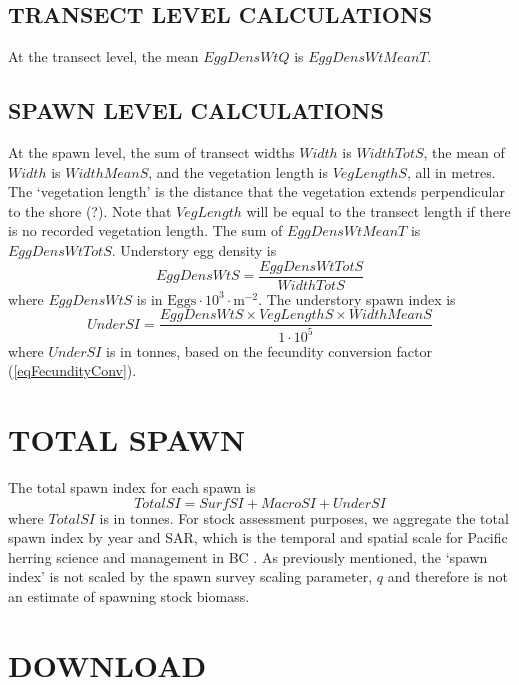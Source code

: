 \documentclass[12pt]{article}
\begin{document}
\subsection{TRANSECT LEVEL CALCULATIONS}

At the transect level, the mean $EggDensWtQ$ is $EggDensWtMeanT$.

\subsection{SPAWN LEVEL CALCULATIONS}

At the spawn level, the sum of transect widths $Width$ is $WidthTotS$, the mean of $Width$ is $WidthMeanS$, and the vegetation length is $VegLengthS$, all in metres.
The `vegetation length' is the distance that the vegetation extends perpendicular to the shore (?).
Note that $VegLength$ will be equal to the transect length if there is no recorded vegetation length.
The sum of $EggDensWtMeanT$ is $EggDensWtTotS$.
Understory egg density is 
\begin{equation}
EggDensWtS = \frac{EggDensWtTotS} {WidthTotS}
\label{eqEggDensityUnder}
\end{equation}
where $EggDensWtS$ is in $\text{Eggs} \cdot 10^{3} \cdot \text{m}^{-2}$.
The understory spawn index is
\begin{equation}
UnderSI = \frac{EggDensWtS \times VegLengthS \times WidthMeanS} {1 \cdot 10^{5}}
\label{eqBiomassUnder}
\end{equation}
where $UnderSI$ is in tonnes, based on the fecundity conversion factor (\autoref{eqFecundityConv}).

\section{TOTAL SPAWN}\label{secTotal}

The total spawn index for each spawn is
\begin{equation}
TotalSI = SurfSI + MacroSI + UnderSI
\label{eqTotalSI}
\end{equation}
where $TotalSI$ is in tonnes.
For stock assessment purposes, we aggregate the total spawn index by year and SAR, which is the temporal and spatial scale for Pacific herring science and management in BC \citeyearpar[CSAS][]{CSAS2015b}.
As previously mentioned, the `spawn index' is not scaled by the spawn survey scaling parameter, $q$ \citeyearpar[CSAS][]{CSAS2015b} and therefore is not an estimate of spawning stock biomass.

\section{DOWNLOAD}\label{secDown}
\end{document}
